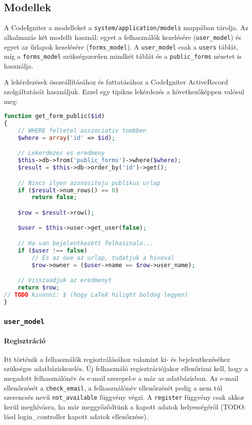 \documentclass[12pt,a4paper,twoside]{article}
\begin{document}
\subsection{Modellek}

A CodeIgniter a modelleket a \texttt{system/application/models} mappában
tárolja. Az alkalmazás két modellt használ: egyet a felhasználók kezelésére
(\texttt{user\_model}) és egyet az űrlapok kezelésére (\texttt{forms\_model}). A
\texttt{user\_model} csak a \texttt{users} táblát, míg a
\texttt{forms\_model} szükségszerűen mindkét táblát és a \texttt{public\_forms}
nézetet is használja.

A lekérdezések összeállításához és futtatásához a CodeIgniter ActiveRecord
szolgáltatását használjuk. Ezzel egy tipikus lekérdezés a következőképpen
valósul meg:

\begin{lstlisting}[language=PHP]
function get_form_public($id)
{
    // WHERE feltetel asszociativ tombben
    $where = array('id' => $id);

    // Lekerdezes es eredmeny
    $this->db->from('public_forms')->where($where);
    $result = $this->db->order_by('id')->get();

    // Nincs ilyen azonositoju publikus urlap
    if ($result->num_rows() == 0)
        return false;

    $row = $result->row();

    $user = $this->user->get_user(false);

    // Ha van bejelentkezett felhasznalo...
    if ($user !== false)
        // Es az ove az urlap, tudatjuk a hivoval
        $row->owner = ($user->name == $row->user_name);

    // Visszaadjuk az eredmenyt
    return $row;
// TODO kivenni: $ (hogy LaTeX hilight boldog legyen)
}
\end{lstlisting}

\subsubsection{\texttt{user\_model}}

\paragraph{Regisztráció}
Itt történik a felhasználók regisztrálásához valamint ki- és bejelentkezéséhez
szükséges adatbáziskezelés. Új felhasználó regisztrációjakor ellenőrizni
kell, hogy a megadott felhasználónév és e-mail szerepel-e a már az
adatbázisban. Az e-mail ellenőrzését a \texttt{check\_email}, a felhasználónév
ellenőrzését pedig a nem túl szerencsés nevű \texttt{not\_available} függvény
végzi. A \texttt{register} függvény csak akkor kerül meghívásra, ha már
meggyőződtünk a kapott adatok helyességéről (TODO: lásd login\_controller kapott
adatok ellenőrzése).
\end{document}
